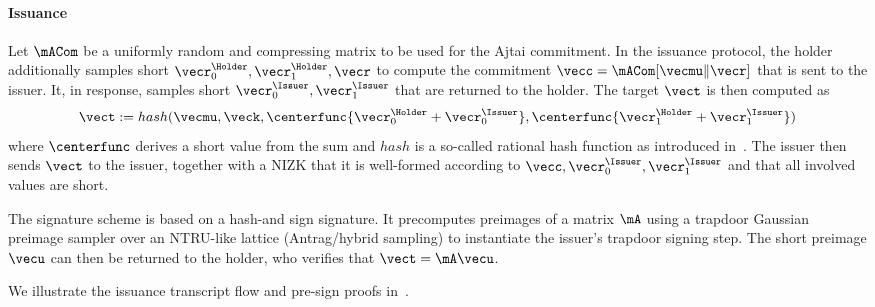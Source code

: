 \paragraph*{Issuance}
Let $\mACom$ be a uniformly random and compressing matrix to be used for the Ajtai commitment. In the issuance protocol, the holder additionally samples  short $\vecr_0^\Holder,\vecr_1^\Holder,\vecr$  to compute the commitment $\vecc=\mACom [\vecmu \Vert \vecr]$ that is sent to the issuer. It, in response, samples short $\vecr_0^\Issuer,\vecr_1^\Issuer$ that are returned to the holder. The target $\vect$ is then computed as
	$$ \vect :=hash(\vecmu,\veck,\centerfunc{\vecr_0^\Holder+\vecr_0^\Issuer},\centerfunc{\vecr_1^\Holder+\vecr_1^\Issuer})$$
	where $\centerfunc$ derives a short value from the sum and $hash$ is a
  so-called rational hash function as introduced in~\cite{C:BLNS23}. The issuer
  then sends $\vect$ to the issuer, together with a NIZK that it is well-formed according to $\vecc,\vecr_0^\Issuer,\vecr_1^\Issuer$ and that all involved values are short.

 The signature scheme is based on a hash-and sign signature. It precomputes preimages of a matrix $\mA$ using a trapdoor Gaussian preimage sampler over an
	NTRU-like lattice (Antrag/hybrid sampling) to instantiate the issuer’s trapdoor signing step. The short preimage $\vecu$ can then be returned to the holder, who verifies that $\vect = \mA \vecu$.
	
	We illustrate the issuance transcript flow and pre-sign proofs in~.
	

